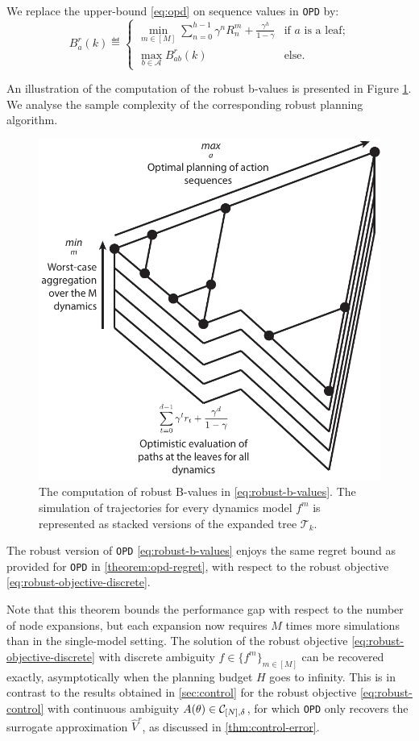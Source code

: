 \documentclass{article}
\begin{document}
\begin{definition} We replace the upper-bound \eqref{eq:opd} on sequence values in \texttt{OPD} by:
\begin{equation}
\label{eq:robust-b-values}
B_a^r(k)  \eqdef
\begin{cases}
\min_{m\in[M]} \sum_{n=0}^{h-1} \gamma^n R_n^m  + \frac{\gamma^h}{1-\gamma} &\text{if } a \text{ is a leaf;}\\
\max_{b\in\mathcal{A}} B_{ab}^r(k) & \text{else.}
\end{cases}
\end{equation}
\end{definition}
An illustration of the computation of the robust b-values is presented in Figure \ref{fig:drop}. We analyse the sample complexity of the corresponding robust planning algorithm.

\begin{figure}
\centering
\includegraphics[width=0.4\linewidth]{img/robust-control-tree}
\caption{The computation of robust B-values in \eqref{eq:robust-b-values}. The simulation of trajectories for every dynamics model $f^m$ is represented as stacked versions of the expanded tree $\mathcal{T}_k$.}
\label{fig:drop}
\end{figure}

\begin{theorem}
\label{theorem:drop-regret}
The robust version of \texttt{OPD} \eqref{eq:robust-b-values} enjoys the same regret bound as provided for \texttt{OPD} in \autoref{theorem:opd-regret}, with respect to the robust objective \eqref{eq:robust-objective-discrete}.
\end{theorem}

Note that this theorem bounds the performance gap with respect to the number of node expansions, but each expansion now requires $M$ times more simulations than in the single-model setting. The solution of the robust objective \eqref{eq:robust-objective-discrete} with discrete ambiguity $f\in\{f^m\}_{m\in[M]}$ can be recovered exactly, asymptotically when the planning budget $H$ goes to infinity. This is in contrast to the results obtained in \autoref{sec:control} for the robust objective \eqref{eq:robust-control} with continuous ambiguity $A(\theta)\in\mathcal{C}_{[N],\delta}$, for which \texttt{OPD} only recovers the surrogate approximation $\hat{V}^r$, as discussed in \autoref{thm:control-error}.
\end{document}
